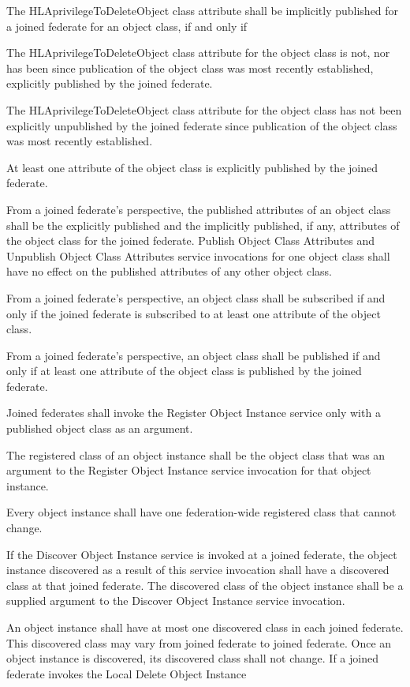 \begin{compactstdpage}
\begin{stdalphalist}
        \item The HLAprivilegeToDeleteObject class attribute shall be implicitly published for a joined federate for an object class, if and only if
        \begin{stdnumlist}
            \item The HLAprivilegeToDeleteObject class attribute for the object class is not, nor has been since publication of the object class was most recently established, explicitly published by the joined federate.
            \item The HLAprivilegeToDeleteObject class attribute for the object class has not been explicitly unpublished by the joined federate since publication of the object class was most recently established.
            \item At least one attribute of the object class is explicitly published by the joined federate.
        \end{stdnumlist}
        \item From a joined federate's perspective, the published attributes of an object class shall be the explicitly published and the implicitly published, if any, attributes of the object class for the joined federate. Publish Object Class Attributes and Unpublish Object Class Attributes service invocations for one object class shall have no effect on the published attributes of any other object class.
        \item From a joined federate's perspective, an object class shall be subscribed if and only if the joined federate is subscribed to at least one attribute of the object class.
        \item From a joined federate's perspective, an object class shall be published if and only if at least one attribute of the object class is published by the joined federate.
        \item Joined federates shall invoke the Register Object Instance service only with a published object class as an argument.
        \item The registered class of an object instance shall be the object class that was an argument to the Register Object Instance service invocation for that object instance.
        \item Every object instance shall have one federation-wide registered class that cannot change.
        \item If the Discover Object Instance \rtiinitiated{} service is invoked at a joined federate, the object instance discovered as a result of this service invocation shall have a discovered class at that joined federate. The discovered class of the object instance shall be a supplied argument to the Discover Object Instance \rtiinitiated{} service invocation.
        \item An object instance shall have at most one discovered class in each joined federate. This discovered class may vary from joined federate to joined federate. Once an object instance is discovered, its discovered class shall not change. If a joined federate invokes the Local Delete Object Instance
    \end{stdalphalist}
\end{compactstdpage}

